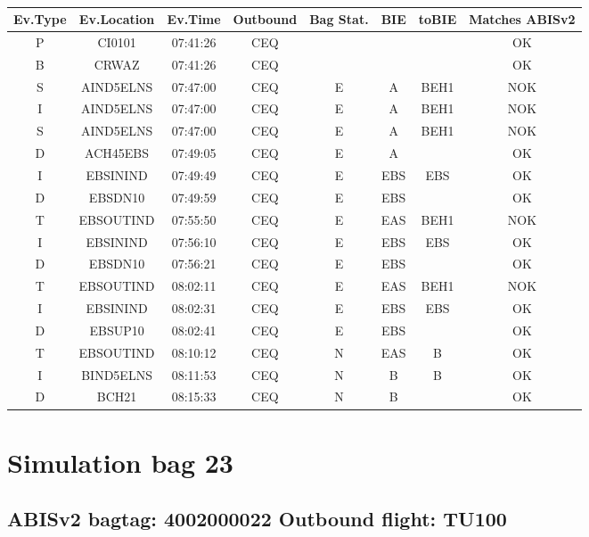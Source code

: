 \documentclass{report}
\begin{document}
\paragraph{}
\begin{longtable}{cccccccc}    \toprule
\rowcolor{white!50}
\textbf{Ev.Type} & \textbf{Ev.Location} & \textbf{Ev.Time} & \textbf{Outbound} & \textbf{Bag Stat.} & \textbf{BIE} & \textbf{toBIE} & \textbf{Matches ABISv2} \\\midrule
P & CI0101 & 07:41:26  & CEQ &  &  &  & OK\\
B & CRWAZ & 07:41:26  & CEQ &  &  &  & OK\\
S & AIND5ELNS & 07:47:00  & CEQ & E & A & BEH1 & NOK\\
I & AIND5ELNS & 07:47:00  & CEQ & E & A & BEH1 & NOK\\
S & AIND5ELNS & 07:47:00  & CEQ & E & A & BEH1 & NOK\\
D & ACH45EBS & 07:49:05  & CEQ & E & A &  & OK\\
I & EBSININD & 07:49:49  & CEQ & E & EBS & EBS & OK\\
D & EBSDN10 & 07:49:59  & CEQ & E & EBS &  & OK\\
T & EBSOUTIND & 07:55:50  & CEQ & E & EAS & BEH1 & NOK\\
I & EBSININD & 07:56:10  & CEQ & E & EBS & EBS & OK\\
D & EBSDN10 & 07:56:21  & CEQ & E & EBS &  & OK\\
T & EBSOUTIND & 08:02:11  & CEQ & E & EAS & BEH1 & NOK\\
I & EBSININD & 08:02:31  & CEQ & E & EBS & EBS & OK\\
D & EBSUP10 & 08:02:41  & CEQ & E & EBS &  & OK\\
T & EBSOUTIND & 08:10:12  & CEQ & N & EAS & B & OK\\
I & BIND5ELNS & 08:11:53  & CEQ & N & B & B & OK\\
D & BCH21 & 08:15:33  & CEQ & N & B &  & OK\\
\bottomrule
\end{longtable}
\pagebreak
\section*{Simulation bag 23}
\subsection*{ABISv2 bagtag: 4002000022 Outbound flight: TU100}
\end{document}
